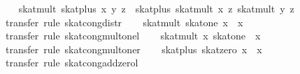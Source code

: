 \begin{isabellebody}
\ \ \isamarkupfalse%
\ {}skat{}mult\ {}skat{}plus\ x\ y{}\ z\ {}\ skat{}plus\ {}skat{}mult\ x\ z{}\ {}skat{}mult\ y\ z{}{}\isanewline
\ \ \ \ \isamarkupfalse%
\ {}transfer{}\ rule\ skat{}cong{}distr{}\isanewline
\ \ \isamarkupfalse%
\ {}skat{}mult\ skat{}one\ x\ {}\ x{}\isanewline
\ \ \ \ \isamarkupfalse%
\ {}transfer{}\ rule\ skat{}cong{}mult{}onel{}\isanewline
\ \ \isamarkupfalse%
\ {}skat{}mult\ x\ skat{}one\ {}\ x{}\isanewline
\ \ \ \ \isamarkupfalse%
\ {}transfer{}\ rule\ skat{}cong{}mult{}oner{}\isanewline
\ \ \isamarkupfalse%
\ {}skat{}plus\ skat{}zero\ x\ {}\ x{}\isanewline
\ \ \ \ \isamarkupfalse%
\ {}transfer{}\ rule\ skat{}cong{}add{}zerol{}\isanewline
\ \ \isamarkupfalse%

\end{isabellebody}
